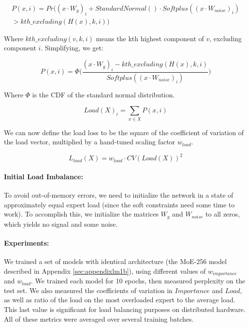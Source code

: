 \documentclass{article} %
\begin{document}
\begin{equation}
\begin{aligned}
P(x, i) = Pr\Big( (x \cdot W_g)_i + StandardNormal() \cdot Softplus((x \cdot W_{noise})_i) \\ > kth\_excluding(H(x), k, i)\Big)
\end{aligned}
\end{equation}

Where $kth\_excluding(v, k, i)$ means the kth highest component of $v$, excluding component $i$.  Simplifying, we get:

\begin{equation}
    P(x, i) = \Phi\Big(\frac{(x \cdot W_g)_i - kth\_excluding(H(x), k, i)}{Softplus((x \cdot W_{noise})_i)}\Big)
\end{equation}

Where $\Phi$ is the CDF of the standard normal distribution.

\begin{equation}
    Load(X)_i = \sum_{x \in X}P(x, i) 
\end{equation}

We can now define the load loss to be the square of the coefficient of variation of the load vector, multiplied by a hand-tuned scaling factor $w_{load}$.

\begin{equation}\label{eq:loadloss}
L_{load}(X) = w_{load} \cdot CV(Load(X))^2
\end{equation}

\paragraph{Initial Load Imbalance:}  To avoid out-of-memory errors, we need to initialize the network in a state of approximately equal expert load (since the soft constraints need some time to work).  To accomplish this, we initialize the matrices $W_g$ and $W_{noise}$ to all zeros, which yields no signal and some noise.

\paragraph{Experiments:} We trained a set of models with identical architecture (the MoE-256 model described in Appendix \ref{sec:appendixlm1b}), using different values of $w_{importance}$ and $w_{load}$.  We trained each model for 10 epochs, then measured perplexity on the test set.  We also measured the coefficients of variation in $Importance$ and $Load$, as well as ratio of the load on the most overloaded expert to the average load.  This last value is significant for load balancing purposes on distributed hardware.  All of these metrics were averaged over several training batches.
\end{document}
